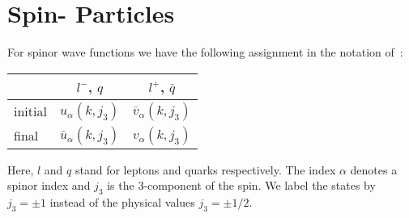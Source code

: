 \documentclass[a4paper,12pt]{amsart}
\begin{document}

\section{Spin-\texorpdfstring{}{1/2} Particles}
For spinor wave functions we have the following assignment in the
notation of~\cite{1}:
\begin{center}
\begin{tabular}{l|cc}
     &     $l^-$, $q$ & $l^+$, $\bar{q}$\\
\hline
initial & $u_\alpha(k, j_3)$ & $\bar{v}_\alpha(k, j_3)$ \\
final & $\bar{u}_\alpha(k, j_3)$ & $v_\alpha(k, j_3)$
\end{tabular}
\end{center}
Here, $l$ and $q$ stand for leptons and quarks respectively.
The index $\alpha$ denotes a spinor index and $j_3$ is the 3-component
of the spin.
We label the states by $j_3=\pm1$ instead of the physical values
$j_3=\pm1/2$.
\end{document}
